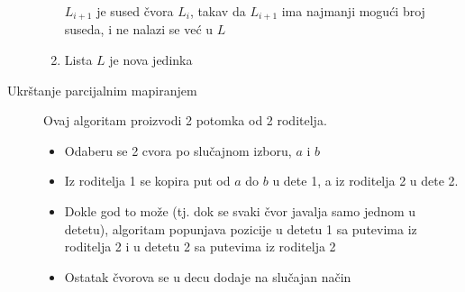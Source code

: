 \documentclass[titlepage]{article}
\theoremstyle{remark}
\theoremstyle{definition}
\begin{document}
\begin{description}
\begin{enumerate}
              $L_{i+1}$ je sused \v{c}vora $L_i$, takav da $L_{i+1}$ ima najmanji mogu\'{c}i broj suseda, i ne nalazi se ve\'{c} u $L$
              \item Lista $L$ je nova jedinka
            \end{enumerate}
          \item[Ukr\v{s}tanje parcijalnim mapiranjem] Ovaj algoritam proizvodi 2 potomka od 2 roditelja.
          \begin{itemize}
            \item Odaberu se 2 cvora po slu\v{c}ajnom izboru, $a$ i $b$
            \item Iz roditelja 1 se kopira put od $a$ do $b$ u dete 1, a iz roditelja 2 u dete 2.
            \item Dokle god to mo\v{z}e (tj. dok se svaki \v{c}vor javalja samo jednom u detetu), algoritam popunjava pozicije u detetu 1 sa putevima iz roditelja 2 i  u detetu 2 sa putevima iz roditelja 2
            \item Ostatak \v{c}vorova se u decu dodaje na slu\v{c}ajan na\v{c}in
          \end{itemize}
        \end{description}
        
	
\end{document}
